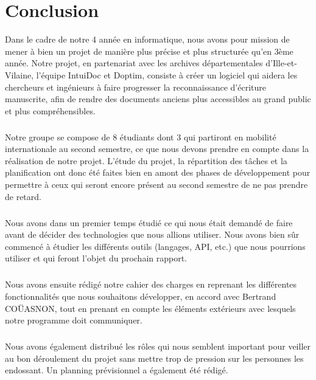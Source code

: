 \chapter{Conclusion}

Dans le cadre de notre 4 année en informatique, nous avons pour mission de
mener à bien un projet de manière plus précise et plus structurée qu’en 3ème année.
Notre projet, en partenariat avec les archives départementales d’Ille-et-Vilaine,
l’équipe IntuiDoc et Doptim, consiste à créer un logiciel qui aidera les chercheurs et
ingénieurs à faire progresser la reconnaissance d’écriture manuscrite, afin de rendre
des documents anciens plus accessibles au grand public et plus compréhensibles.

\paragraph{}
Notre groupe se compose de 8 étudiants dont 3 qui partiront en mobilité internationale
au second semestre, ce que nous devons prendre en compte dans la réalisation de notre
projet. L’étude du projet, la répartition des tâches et la planification ont donc été
faites bien en amont des phases de développement pour permettre à ceux qui seront encore
présent au second semestre de ne pas prendre de retard.

\paragraph{}
Nous avons dans un premier temps étudié ce qui nous était demandé de faire avant de
décider des technologies que nous allions utiliser. Nous avons bien sûr commencé à
étudier les différents outils (langages, API, etc.) que nous pourrions utiliser et qui
feront l’objet du prochain rapport.

\paragraph{}
Nous avons ensuite rédigé notre cahier des charges en reprenant les différentes fonctionnalités
que nous souhaitons développer, en accord avec Bertrand COÜASNON, tout en prenant en compte
les éléments extérieurs avec lesquels notre programme doit communiquer.

\paragraph{}
Nous avons également distribué les rôles qui nous semblent important pour veiller au bon
déroulement du projet sans mettre trop de pression sur les personnes les endossant.
Un planning prévisionnel a également été rédigé.